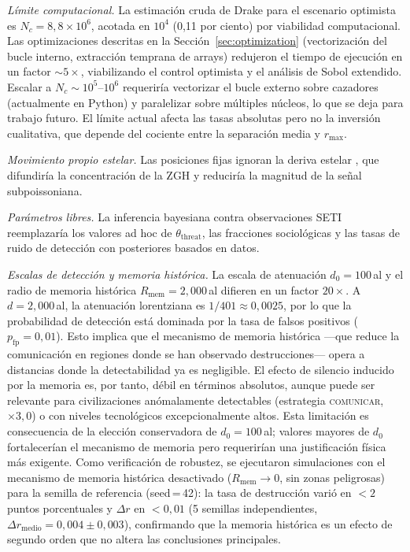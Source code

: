 \documentclass[11pt,a4paper,onecolumn]{article}
\begin{document}
\textit{Límite computacional.}
La estimación cruda de Drake para el escenario optimista es
$N_c = 8{,}8\times10^6$, acotada en $10^4$ (0{,}11 por ciento) por
viabilidad computacional.
Las optimizaciones descritas en la Sección~\ref{sec:optimization}
(vectorización del bucle interno, extracción temprana de arrays)
redujeron el tiempo de ejecución en un factor $\sim 5\times$,
viabilizando el control optimista y el análisis de Sobol extendido.
Escalar a $N_c \sim 10^5$--$10^6$ requeriría vectorizar el bucle
externo sobre cazadores (actualmente en Python) y paralelizar sobre
múltiples núcleos, lo que se deja para trabajo futuro.
El límite actual afecta las tasas absolutas pero no la inversión
cualitativa, que depende del cociente entre la separación media y
$r_\text{max}$.

\textit{Movimiento propio estelar.}
Las posiciones fijas ignoran la deriva estelar
\citep[$\sim 30$\,km\,s$^{-1}$;][]{carrollnellenback2019},
que difundiría la concentración de la ZGH y reduciría la magnitud de
la señal subpoissoniana.

\textit{Parámetros libres.}
La inferencia bayesiana contra observaciones SETI reemplazaría los
valores ad hoc de $\theta_\text{threat}$, las fracciones sociológicas
y las tasas de ruido de detección con posteriores basados en datos.

\textit{Escalas de detección y memoria histórica.}
La escala de atenuación $d_0 = 100$\,al y el radio de memoria histórica
$R_\text{mem} = 2{,}000$\,al difieren en un factor $20\times$.
A $d = 2{,}000$\,al, la atenuación lorentziana es $1/401 \approx
0{,}0025$, por lo que la probabilidad de detección está dominada por
la tasa de falsos positivos ($p_\text{fp} = 0{,}01$).
Esto implica que el mecanismo de memoria histórica —que reduce la
comunicación en regiones donde se han observado destrucciones— opera
a distancias donde la detectabilidad ya es negligible.
El efecto de silencio inducido por la memoria es, por tanto, débil en
términos absolutos, aunque puede ser relevante para civilizaciones
anómalamente detectables (estrategia \textsc{comunicar}, $\times 3{,}0$)
o con niveles tecnológicos excepcionalmente altos.
Esta limitación es consecuencia de la elección conservadora de
$d_0 = 100$\,al; valores mayores de $d_0$ fortalecerían el mecanismo
de memoria pero requerirían una justificación física más exigente.
Como verificación de robustez, se ejecutaron simulaciones con el
mecanismo de memoria histórica desactivado ($R_\text{mem} \to 0$,
sin zonas peligrosas) para la semilla de referencia (seed\,=\,42):
la tasa de destrucción varió en $< 2$ puntos porcentuales y
$\Delta r$ en $< 0{,}01$ (5 semillas independientes, $\Delta r_\text{medio} = 0{,}004 \pm 0{,}003$), confirmando que la memoria histórica
es un efecto de segundo orden que no altera las conclusiones
principales.
\end{document}
